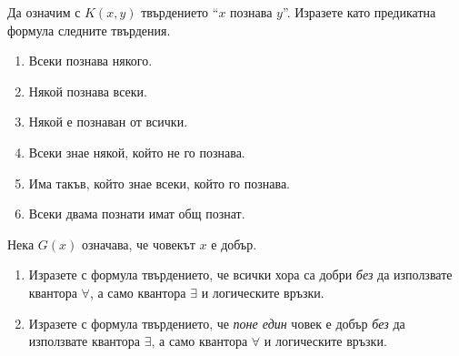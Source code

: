 

\begin{problem}
  Да означим с $K(x,y)$ твърдението ``$x$ познава $y$''.
  Изразете като предикатна формула следните твърдения.
  \begin{enumerate}[1)]
  \item
    Всеки познава някого.
  \item
    Някой познава всеки.
  \item
    Някой е познаван от всички.
  \item
    Всеки знае някой, който не го познава.
  \item
    Има такъв, който знае всеки, който го познава.
  \item
    Всеки двама познати имат общ познат.
  \end{enumerate}
\end{problem}

\begin{problem}
  Нека $G(x)$ означава, че човекът $x$ е добър.
  \begin{enumerate}[1)]
  \item
    Изразете с формула твърдението, че всички хора са добри {\em без}
    да използвате квантора $\forall$, а само квантора $\exists$ и логическите връзки.
  \item
    Изразете с формула твърдението, че {\em поне един} човек е добър {\em без}
    да използвате квантора $\exists$, а само квантора $\forall$ и логическите връзки.
  \end{enumerate}
\end{problem}

